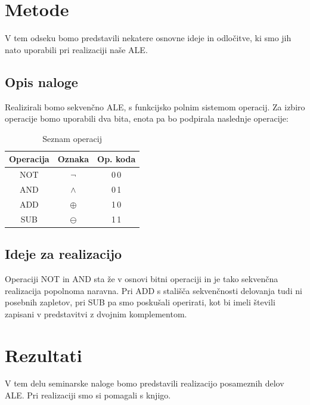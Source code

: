 \documentclass[seminar, slovene]{FRIreport}
\begin{document}
%
\section{Metode}
V tem odseku bomo predstavili nekatere osnovne ideje in odločitve, ki smo jih nato uporabili pri realizaciji naše ALE.

\subsection{Opis naloge}
Realizirali bomo sekvenčno ALE, s funkcijsko polnim sistemom operacij. Za izbiro operacije bomo uporabili dva bita, enota pa bo podpirala naslednje operacije:\\
\begin{table}[h!]
\begin{center}
\begin{tabular}{ | c | c | c | }\hline
\textbf{Operacija} & \textbf{Oznaka} & \textbf{Op. koda} \\ \hline
NOT & $\lnot$ & 0\,0 \\
AND & $\wedge$ & 0\,1 \\
ADD & $\oplus$ & 1\,0 \\
SUB & $\ominus$ & 1\,1 \\ \hline
\end{tabular}
\end{center}
\caption{Seznam operacij}
\label{optable}
\end{table}
\subsection{Ideje za realizacijo}
Operaciji NOT in AND sta že v osnovi bitni operaciji in je tako sekvenčna realizacija popolnoma naravna. Pri ADD s stališča sekvenčnosti delovanja tudi ni posebnih zapletov, pri SUB pa smo poskušali operirati, kot bi imeli števili zapisani v predstavitvi z dvojnim komplementom.

%
\section{Rezultati}
V tem delu seminarske naloge bomo predstavili realizacijo posameznih delov ALE. Pri realizaciji smo si pomagali s knjigo\cite{virant:2007}.
\end{document}
